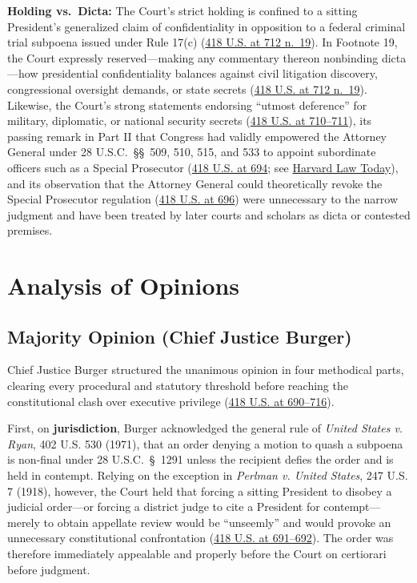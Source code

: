 \documentclass[12pt]{article}
\begin{document}
\textbf{Holding vs.\ Dicta:} The Court's strict holding is confined to a sitting President's generalized claim of confidentiality in opposition to a federal criminal trial subpoena issued under Rule 17(c) (\href{https://supreme.justia.com/cases/federal/us/418/683/}{418 U.S. at 712 n.\ 19}). In Footnote 19, the Court expressly reserved---making any commentary thereon nonbinding dicta---how presidential confidentiality balances against civil litigation discovery, congressional oversight demands, or state secrets (\href{https://supreme.justia.com/cases/federal/us/418/683/}{418 U.S. at 712 n.\ 19}). Likewise, the Court's strong statements endorsing ``utmost deference'' for military, diplomatic, or national security secrets (\href{https://supreme.justia.com/cases/federal/us/418/683/}{418 U.S. at 710--711}), its passing remark in Part II that Congress had validly empowered the Attorney General under 28 U.S.C.\ \S\S\ 509, 510, 515, and 533 to appoint subordinate officers such as a Special Prosecutor (\href{https://supreme.justia.com/cases/federal/us/418/683/}{418 U.S. at 694}; see \href{https://hls.harvard.edu/today/are-presidents-above-the-law-50-years-ago-the-supreme-court-said-no/}{Harvard Law Today}), and its observation that the Attorney General could theoretically revoke the Special Prosecutor regulation (\href{https://supreme.justia.com/cases/federal/us/418/683/}{418 U.S. at 696}) were unnecessary to the narrow judgment and have been treated by later courts and scholars as dicta or contested premises.

\section{Analysis of Opinions}

\subsection{Majority Opinion (Chief Justice Burger)}

Chief Justice Burger structured the unanimous opinion in four methodical parts, clearing every procedural and statutory threshold before reaching the constitutional clash over executive privilege (\href{https://supreme.justia.com/cases/federal/us/418/683/}{418 U.S. at 690--716}).

First, on \textbf{jurisdiction}, Burger acknowledged the general rule of \textit{United States v. Ryan}, 402 U.S. 530 (1971), that an order denying a motion to quash a subpoena is non-final under 28 U.S.C.\ \S\ 1291 unless the recipient defies the order and is held in contempt. Relying on the exception in \textit{Perlman v. United States}, 247 U.S. 7 (1918), however, the Court held that forcing a sitting President to disobey a judicial order---or forcing a district judge to cite a President for contempt---merely to obtain appellate review would be ``unseemly'' and would provoke an unnecessary constitutional confrontation (\href{https://supreme.justia.com/cases/federal/us/418/683/}{418 U.S. at 691--692}). The order was therefore immediately appealable and properly before the Court on certiorari before judgment.
\end{document}
